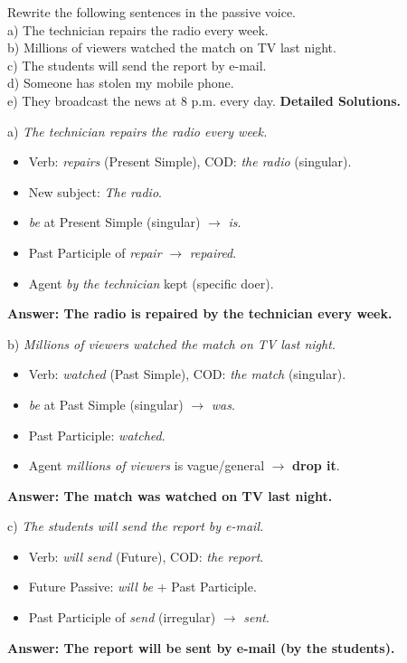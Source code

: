 \documentclass[11pt]{article}
\begin{document}
\begin{exoresolu}
Rewrite the following sentences in the passive voice.\\
a) The technician repairs the radio every week.\\
b) Millions of viewers watched the match on TV last night.\\
c) The students will send the report by e-mail.\\
d) Someone has stolen my mobile phone.\\
e) They broadcast the news at 8 p.m. every day.
\tcblower
\textbf{Detailed Solutions.}

a) \emph{The technician repairs the radio every week.}
\begin{itemize}
\item Verb: \emph{repairs} (Present Simple), COD: \emph{the radio} (singular).
\item New subject: \emph{The radio}.
\item \emph{be} at Present Simple (singular) $\rightarrow$ \emph{is}.
\item Past Participle of \emph{repair} $\rightarrow$ \emph{repaired}.
\item Agent \emph{by the technician} kept (specific doer).
\end{itemize}
\textbf{Answer: The radio is repaired by the technician every week.}

b) \emph{Millions of viewers watched the match on TV last night.}
\begin{itemize}
\item Verb: \emph{watched} (Past Simple), COD: \emph{the match} (singular).
\item \emph{be} at Past Simple (singular) $\rightarrow$ \emph{was}.
\item Past Participle: \emph{watched}.
\item Agent \emph{millions of viewers} is vague/general $\rightarrow$ \textbf{drop it}.
\end{itemize}
\textbf{Answer: The match was watched on TV last night.}

c) \emph{The students will send the report by e-mail.}
\begin{itemize}
\item Verb: \emph{will send} (Future), COD: \emph{the report}.
\item Future Passive: \emph{will be} + Past Participle.
\item Past Participle of \emph{send} (irregular) $\rightarrow$ \emph{sent}.
\end{itemize}
\textbf{Answer: The report will be sent by e-mail (by the students).}


\end{exoresolu}
\end{document}
